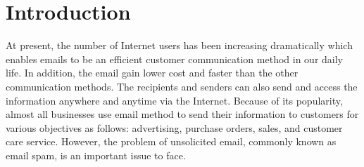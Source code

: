 \documentclass[conference]{IEEEtran}
\begin{document}
\section{Introduction}
%
At present, the number of Internet users has been increasing dramatically which enables emails to be an efficient customer communication method in our daily life.
In addition, the email gain lower cost and faster than the other communication methods. 
The recipients and senders can also send and access the information anywhere and anytime via the Internet.
Because of its popularity, almost all businesses use email method to send their information to customers for various objectives as follows: advertising, purchase orders, sales, and customer care service.
However, the problem of unsolicited email, commonly known as email spam, is an important issue to face.

\end{document}
